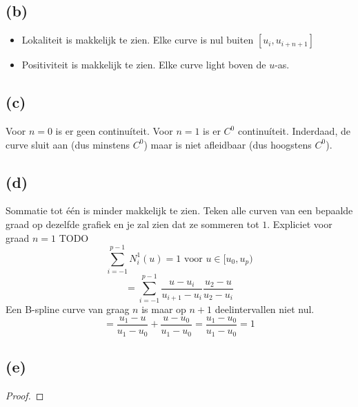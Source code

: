 \documentclass[10pt,a4paper]{article}
\begin{document}
\subsection*{(b)}
\begin{itemize}
\item Lokaliteit is makkelijk te zien. Elke curve is nul buiten $[u_i,u_{i+n+1}]$
\item Positiviteit is makkelijk te zien. Elke curve light boven de $u$-as.
\end{itemize}

\subsection*{(c)}
Voor $n=0$ is er geen continu\'iteit. Voor $n=1$ is er $C^{0}$ continu\'iteit. Inderdaad, de curve sluit aan (dus minstens $C^0$) maar is niet afleidbaar (dus hoogstens $C^0$).

\subsection*{(d)}
Sommatie tot \'e\'en is minder makkelijk te zien. Teken alle curven van een bepaalde graad op dezelfde grafiek en je zal zien dat ze sommeren tot $1$.
Expliciet voor graad $n=1$ TODO
\[
\sum_{i=-1}^{p-1}N_{i}^{1}(u) = 1 \text{ voor } u\in [u_0,u_p)
\]
\[
=\sum_{i=-1}^{p-1}
\frac{u-u_i}{u_{i+1}-u_i}\frac{u_2-u}{u_2-u_i} 
\]
Een B-spline curve van graag $n$ is maar op $n+1$ deelintervallen niet nul. 
\[
= \frac{u_1-u}{u_1-u_0}
+ \frac{u-u_{0}}{u_{1}-u_{0}}
=
\frac{u_1-u_0}{u_1-u_0}
= 1
\]

\subsection*{(e)}
\begin{proof}
\end{proof}



\end{document}
